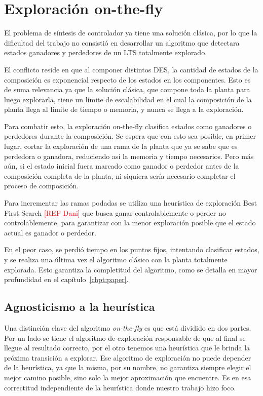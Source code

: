 \section{Exploración on-the-fly}

El problema de síntesis de controlador ya tiene una solución clásica, por lo que la dificultad del trabajo no consistió en desarrollar un algoritmo que detectara estados ganadores y perdedores de un LTS totalmente explorado. 

El conflicto reside en que al componer distintos DES, la cantidad de estados de la composición es exponencial respecto de los estados en los componentes. Esto es de suma relevancia ya que la solución clásica, que compone toda la planta para luego explorarla, tiene un límite de escalabilidad en el cual la composición de la planta llega al límite de tiempo o memoria, y nunca se llega a la exploración.

Para combatir esto, la exploración on-the-fly clasifica estados como ganadores o perdedores durante la composición. Se espera que con esto sea posible, en primer lugar, cortar la exploración de una rama de la planta que ya se sabe que es perdedora o ganadora, reduciendo así la memoria y tiempo necesarios. Pero más aún, si el estado inicial fuera marcado como ganador o perdedor antes de la composición completa de la planta, ni siquiera sería necesario completar el proceso de composición.

Para incrementar las ramas podadas se utiliza una heurística de exploración Best First Search \textcolor{red}{[REF Dani]} que busca ganar controlablemente o perder no controlablemente, para garantizar con la menor exploración posible que el estado actual es ganador o perdedor.

En el peor caso, se perdió tiempo en los puntos fijos, intentando clasificar estados, y se realiza una última vez el algoritmo clásico con la planta totalmente explorada. Esto garantiza la completitud del algoritmo, como se detalla en mayor profundidad en el capítulo~\ref{chpt:paper}.

\subsection{Agnosticismo a la heurística}

Una distinción clave del algoritmo \textit{on-the-fly} es que está dividido en dos partes. Por un lado se tiene el algoritmo de exploración responsable de que al final se llegue al resultado correcto, por el otro tenemos una heurística que le brinda la próxima transición a explorar. Ese algoritmo de exploración no puede depender de la heurística, ya que la misma, por su nombre, no garantiza siempre elegir el mejor camino posible, sino solo la mejor aproximación que encuentre. Es en esa correctitud independiente de la heurística donde nuestro trabajo hizo foco.


